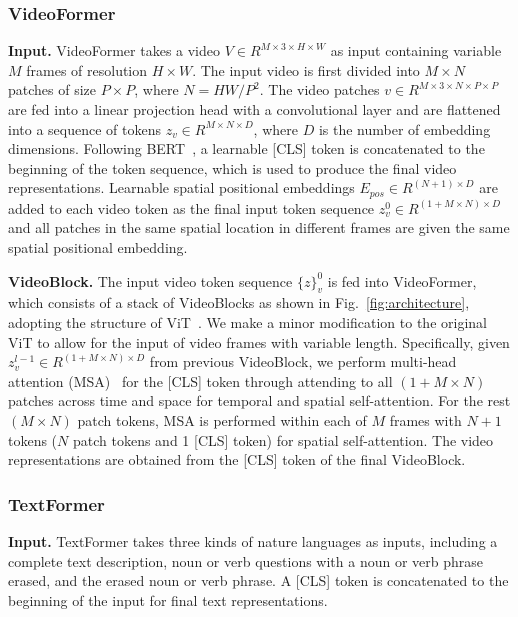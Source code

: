 \documentclass[10pt,twocolumn,letterpaper]{article}
\begin{document}
\subsubsection{VideoFormer}
{\flushleft \bf Input.} VideoFormer takes a video $V\in R^{M \times 3 \times H \times W}$ as input containing variable $M$ frames of resolution $H \times W$. The input video is first divided into $M \times N$ patches of size $P \times P$, where $N=HW/P^2$. The video patches $v\in R^{M \times 3 \times N \times P \times P}$ are fed into a linear projection head with a convolutional layer and are flattened into a sequence of tokens $z_v \in R^{M\times N \times D}$, where $D$ is the number of embedding dimensions. Following BERT~\cite{bert}, a learnable [CLS] token is concatenated to the beginning of the token sequence, which is used to produce the final video representations. Learnable spatial positional embeddings $E_{pos} \in R^{(N+1)\times D}$ are added to each video token as the final input token sequence  $z_v^0 \in R^{(1+M\times N) \times D}$ and all patches in the same spatial location in different frames are given the same spatial positional embedding.

{\flushleft \bf VideoBlock.} The input video token sequence $\{z\}_v^0$ is fed into VideoFormer, which consists of a stack of VideoBlocks as shown in Fig.~\ref{fig:architecture}, adopting the structure of ViT~\cite{vit}. We make a minor modification to the original ViT to allow for the input of video frames with variable length. Specifically, given $z_v^{l-1} \in R^{(1+M\times N) \times D}$ from previous VideoBlock, we perform multi-head attention (MSA)~\cite{vit} for the [CLS] token through attending to all $(1+M\times N)$ patches across time and space for temporal and spatial self-attention. For the rest $(M\times N)$ patch tokens, MSA is performed within each of $M$ frames with $N+1$ tokens ($N$ patch tokens and 1 [CLS] token) for spatial self-attention. The video representations are obtained from the [CLS] token of the final VideoBlock.

\subsubsection{TextFormer}
{\flushleft \bf Input.} TextFormer takes three kinds of nature languages as inputs, including a complete text description, noun or verb questions with a noun or verb phrase erased, and the erased noun or verb phrase. A [CLS] token is concatenated to the beginning of the input for final text representations.
\end{document}
